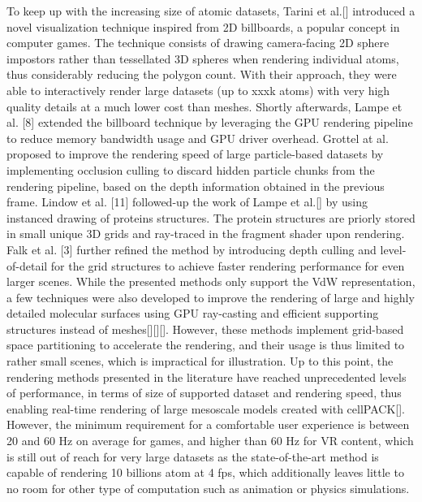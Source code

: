 To keep up with the increasing size of atomic datasets, Tarini et al.[] introduced a novel visualization technique inspired from 2D billboards, a popular concept in computer games.
The technique consists of drawing camera-facing 2D sphere impostors rather than tessellated 3D spheres when rendering individual atoms, thus considerably reducing the polygon count.
With their approach, they were able to interactively render large datasets (up to xxxk atoms) with very high quality details at a much lower cost than meshes.
Shortly afterwards, Lampe et al. [8] extended the billboard technique by leveraging the GPU rendering pipeline to reduce memory bandwidth usage and GPU driver overhead. 
Grottel at al. proposed to improve the rendering speed of large particle-based datasets by implementing occlusion culling to discard hidden particle chunks from the rendering pipeline, based on the depth information obtained in the previous frame.
Lindow et al. [11] followed-up the work of Lampe et al.[] by using instanced drawing of proteins structures.
The protein structures are priorly stored in small unique 3D grids and ray-traced in the fragment shader upon rendering.
Falk et al. [3] further refined the method by introducing depth culling and level-of-detail for the grid structures to achieve faster rendering performance for even larger scenes.
While the presented methods only support the VdW representation, a few techniques were also developed to improve the rendering of large and highly detailed molecular surfaces using GPU ray-casting and efficient supporting structures instead of meshes[][][]. 
However, these methods implement grid-based space partitioning to accelerate the rendering, and their usage is thus limited to rather small scenes, which is impractical for illustration.
Up to this point, the rendering methods presented in the literature have reached unprecedented levels of performance, in terms of size of supported dataset and rendering speed, thus enabling real-time rendering of large mesoscale models created with cellPACK[].
However, the minimum requirement for a comfortable user experience is between 20 and 60 Hz on average for games, and higher than 60 Hz for VR content, which is still out of reach for very large datasets as the state-of-the-art method is capable of rendering 10 billions atom at 4 fps, which additionally leaves little to no room for other type of computation such as animation or physics simulations.

